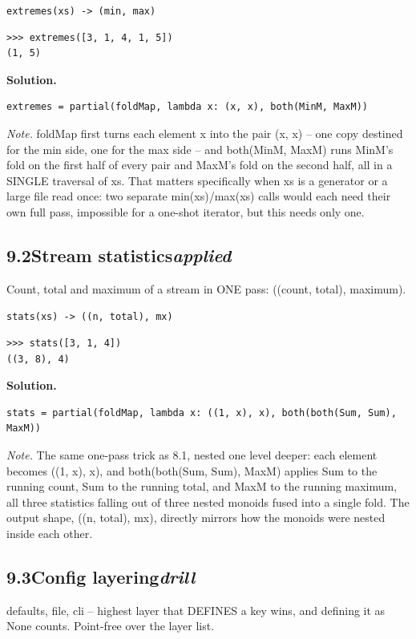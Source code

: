 \documentclass[10pt,letterpaper]{book}
\begin{document}
\noindent\texttt{extremes(xs) -> (min, max)}
\begin{lstlisting}[style=ex]
>>> extremes([3, 1, 4, 1, 5])
(1, 5)
\end{lstlisting}
\noindent\textbf{Solution.}
\begin{lstlisting}[style=code]
extremes = partial(foldMap, lambda x: (x, x), both(MinM, MaxM))
\end{lstlisting}
\noindent\textit{Note.} foldMap first turns each element x into the pair (x, x) -- one copy destined for the min side, one for the max side -- and both(MinM, MaxM) runs MinM's fold on the first half of every pair and MaxM's fold on the second half, all in a SINGLE traversal of xs. That matters specifically when xs is a generator or a large file read once: two separate min(xs)/max(xs) calls would each need their own full pass, impossible for a one-shot iterator, but this needs only one.

\subsection*{9.2\quad Stream statistics\hfill\textnormal{\textit{applied}}}
Count, total and maximum of a stream in ONE pass: ((count, total), maximum).

\noindent\texttt{stats(xs) -> ((n, total), mx)}
\begin{lstlisting}[style=ex]
>>> stats([3, 1, 4])
((3, 8), 4)
\end{lstlisting}
\noindent\textbf{Solution.}
\begin{lstlisting}[style=code]
stats = partial(foldMap, lambda x: ((1, x), x), both(both(Sum, Sum), MaxM))
\end{lstlisting}
\noindent\textit{Note.} The same one-pass trick as 8.1, nested one level deeper: each element becomes ((1, x), x), and both(both(Sum, Sum), MaxM) applies Sum to the running count, Sum to the running total, and MaxM to the running maximum, all three statistics falling out of three nested monoids fused into a single fold. The output shape, ((n, total), mx), directly mirrors how the monoids were nested inside each other.

\subsection*{9.3\quad Config layering\hfill\textnormal{\textit{drill}}}
defaults, file, cli -- highest layer that DEFINES a key wins, and defining it as None counts. Point-free over the layer list.
\end{document}
